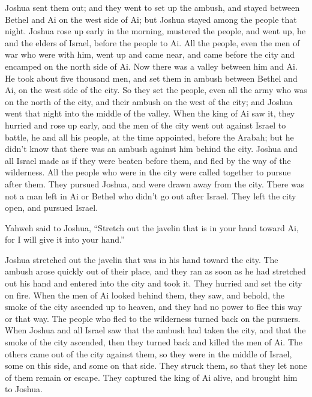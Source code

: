  Joshua sent them out; and they went to set up the ambush,
and stayed between Bethel and Ai on the west side of Ai; but Joshua
stayed among the people that night.  Joshua rose up early
in the morning, mustered the people, and went up, he and the elders of
Israel, before the people to Ai.  All the people, even
the men of war who were with him, went up and came near, and came before
the city and encamped on the north side of Ai. Now there was a valley
between him and Ai.  He took about five thousand men, and
set them in ambush between Bethel and Ai, on the west side of the city.
 So they set the people, even all the army who was on the
north of the city, and their ambush on the west of the city; and Joshua
went that night into the middle of the valley.  When the
king of Ai saw it, they hurried and rose up early, and the men of the
city went out against Israel to battle, he and all his people, at the
time appointed, before the Arabah; but he didn't know that there was an
ambush against him behind the city.  Joshua and all
Israel made as if they were beaten before them, and fled by the way of
the wilderness.  All the people who were in the city were
called together to pursue after them. They pursued Joshua, and were
drawn away from the city.  There was not a man left in Ai
or Bethel who didn't go out after Israel. They left the city open, and
pursued Israel.

 Yahweh said to Joshua, ``Stretch out the javelin that is
in your hand toward Ai, for I will give it into your hand.''

Joshua stretched out the javelin that was in his hand toward the city.
 The ambush arose quickly out of their place, and they
ran as soon as he had stretched out his hand and entered into the city
and took it. They hurried and set the city on fire.  When
the men of Ai looked behind them, they saw, and behold, the smoke of the
city ascended up to heaven, and they had no power to flee this way or
that way. The people who fled to the wilderness turned back on the
pursuers.  When Joshua and all Israel saw that the ambush
had taken the city, and that the smoke of the city ascended, then they
turned back and killed the men of Ai.  The others came
out of the city against them, so they were in the middle of Israel, some
on this side, and some on that side. They struck them, so that they let
none of them remain or escape.  They captured the king of
Ai alive, and brought him to Joshua.

